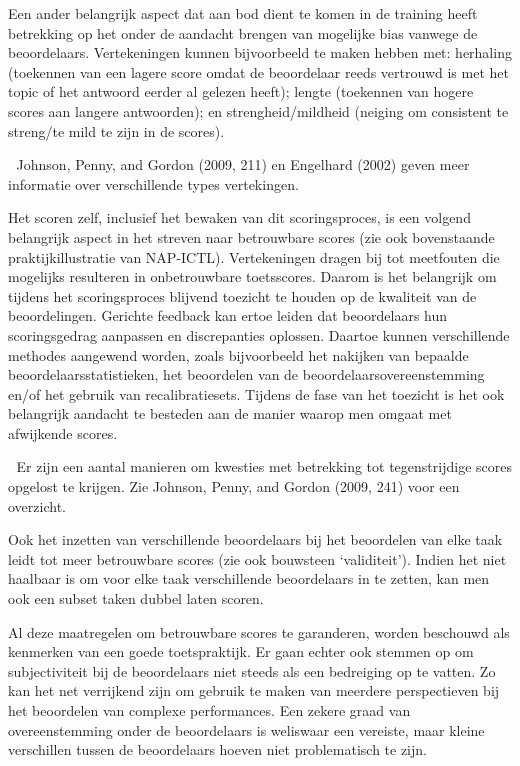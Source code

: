 \documentclass[
  letterpaper,
]{report}
\begin{document}
Een ander belangrijk aspect dat aan bod dient te komen in de training
heeft betrekking op het onder de aandacht brengen van mogelijke bias
vanwege de beoordelaars. Vertekeningen kunnen bijvoorbeeld te maken
hebben met: herhaling (toekennen van een lagere score omdat de
beoordelaar reeds vertrouwd is met het topic of het antwoord eerder al
gelezen heeft); lengte (toekennen van hogere scores aan langere
antwoorden); en strengheid/mildheid (neiging om consistent te streng/te
mild te zijn in de scores).

📖 Johnson, Penny, and Gordon (2009, 211) en Engelhard (2002) geven meer
informatie over verschillende types vertekingen.

Het scoren zelf, inclusief het bewaken van dit scoringsproces, is een
volgend belangrijk aspect in het streven naar betrouwbare scores (zie
ook bovenstaande praktijkillustratie van NAP-ICTL). Vertekeningen dragen
bij tot meetfouten die mogelijks resulteren in onbetrouwbare
toetsscores. Daarom is het belangrijk om tijdens het scoringsproces
blijvend toezicht te houden op de kwaliteit van de beoordelingen.
Gerichte feedback kan ertoe leiden dat beoordelaars hun scoringsgedrag
aanpassen en discrepanties oplossen. Daartoe kunnen verschillende
methodes aangewend worden, zoals bijvoorbeeld het nakijken van bepaalde
beoordelaarsstatistieken, het beoordelen van de
beoordelaarsovereenstemming en/of het gebruik van recalibratiesets.
Tijdens de fase van het toezicht is het ook belangrijk aandacht te
besteden aan de manier waarop men omgaat met afwijkende scores.

📖 Er zijn een aantal manieren om kwesties met betrekking tot
tegenstrijdige scores opgelost te krijgen. Zie Johnson, Penny, and
Gordon (2009, 241) voor een overzicht.

Ook het inzetten van verschillende beoordelaars bij het beoordelen van
elke taak leidt tot meer betrouwbare scores (zie ook bouwsteen
`validiteit'). Indien het niet haalbaar is om voor elke taak
verschillende beoordelaars in te zetten, kan men ook een subset taken
dubbel laten scoren.

Al deze maatregelen om betrouwbare scores te garanderen, worden
beschouwd als kenmerken van een goede toetspraktijk. Er gaan echter ook
stemmen op om subjectiviteit bij de beoordelaars niet steeds als een
bedreiging op te vatten. Zo kan het net verrijkend zijn om gebruik te
maken van meerdere perspectieven bij het beoordelen van complexe
performances. Een zekere graad van overeenstemming onder de beoordelaars
is weliswaar een vereiste, maar kleine verschillen tussen de
beoordelaars hoeven niet problematisch te zijn.
\end{document}
